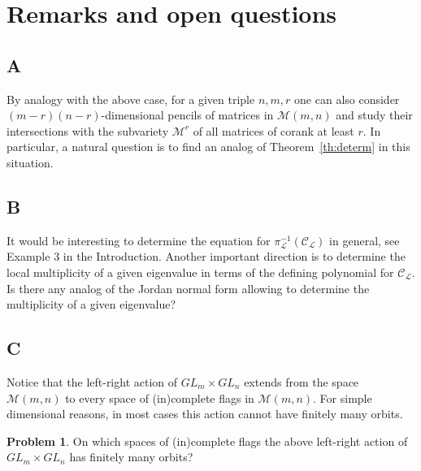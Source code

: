 \documentclass[10pt,twoside,a4paper,reqno]{amsart}
\theoremstyle{plain}
\theoremstyle{definition}
\newtheorem{problem}         {Problem}
\theoremstyle{remark}
\begin{document}
\section{Remarks and open questions}

\subsection*{A}
By analogy with the  above case, for a given triple $n,m,r$ one can   also consider $(m-r)(n-r)$-dimensional pencils of matrices in ${\mathcal {M}}(m,n)$ and study their intersections with the subvariety ${\mathcal {M}}^r$ of all matrices of corank at least $r$. In particular, a natural question is to find an analog of Theorem~\ref{th:determ} in this situation.

\subsection*{B}
It would  be interesting to determine the equation for $\pi^{-1}_{\mathcal L}({\mathcal C}_{\mathcal L})$ in general, see Example 3 in the Introduction. Another important direction is to determine the local multiplicity of a given eigenvalue in terms of the defining polynomial for ${\mathcal C}_{\mathcal L}$.   Is there any analog of the Jordan normal form allowing to determine the multiplicity of a given eigenvalue?

\subsection*{C}
Notice that the left-right action of $GL_m\times GL_n$ extends from the space ${\mathcal {M}}(m,n)$ to every space of (in)complete flags in ${\mathcal {M}}(m,n)$. For simple dimensional reasons, in most cases this action cannot have finitely many orbits.

\begin{problem}
On which spaces of (in)complete flags  the above   left-right action of $GL_m\times  GL_n$ has finitely many orbits?
\end{problem}
\end{document}
